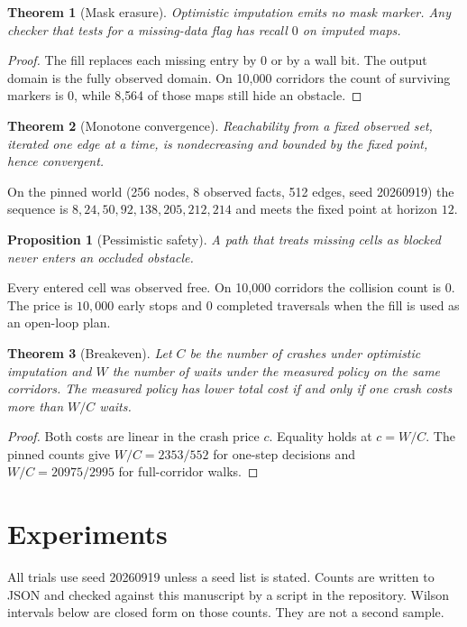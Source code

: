 \documentclass[10pt,twocolumn,letterpaper]{article}
\newtheorem{theorem}{Theorem}
\newtheorem{proposition}{Proposition}
\begin{document}
\begin{theorem}[Mask erasure]
Optimistic imputation emits no mask marker.
Any checker that tests for a missing-data flag has recall $0$ on imputed maps.
\end{theorem}
\begin{proof}
The fill replaces each missing entry by $0$ or by a wall bit.
The output domain is the fully observed domain.
On 10{,}000 corridors the count of surviving markers is $0$, while 8{,}564 of those maps still hide an obstacle.
\end{proof}

\begin{theorem}[Monotone convergence]
Reachability from a fixed observed set, iterated one edge at a time, is nondecreasing and bounded by the fixed point, hence convergent.
\end{theorem}
On the pinned world (256 nodes, 8 observed facts, 512 edges, seed 20260919) the sequence is $8,24,50,92,138,205,212,214$ and meets the fixed point at horizon $12$.

\begin{proposition}[Pessimistic safety]
A path that treats missing cells as blocked never enters an occluded obstacle.
\end{proposition}
Every entered cell was observed free.
On 10{,}000 corridors the collision count is $0$.
The price is $10{,}000$ early stops and $0$ completed traversals when the fill is used as an open-loop plan.

\begin{theorem}[Breakeven]
Let $C$ be the number of crashes under optimistic imputation and $W$ the number of waits under the measured policy on the same corridors.
The measured policy has lower total cost if and only if one crash costs more than $W/C$ waits.
\end{theorem}
\begin{proof}
Both costs are linear in the crash price $c$.
Equality holds at $c=W/C$.
The pinned counts give $W/C=2353/552$ for one-step decisions and $W/C=20975/2995$ for full-corridor walks.
\end{proof}

\section{Experiments}
\label{sec:exp}

All trials use seed 20260919 unless a seed list is stated.
Counts are written to JSON and checked against this manuscript by a script in the repository.
Wilson intervals below are closed form on those counts.
They are not a second sample.
\end{document}
